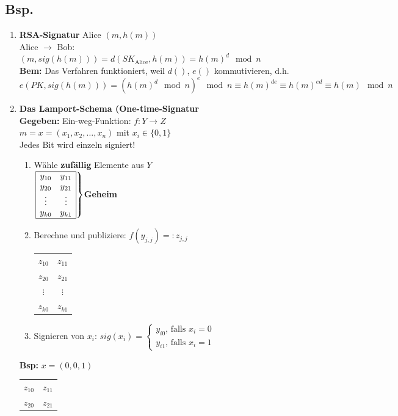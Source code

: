\documentclass[10pt]{article}
\newcommand{\Bold}[1]{\textbf{#1}} %
\newcommand{\T}[1]{\text{#1}} %
\newcommand{\Brackal}[2]{\left\lbrace\begin{array}{#1} #2 \end{array}\right.} %
\newcommand{\Brackar}[2]{\left.\begin{array}{#1} #2 \end{array}\right\rbrace} %
\begin{document}
\subsection*{Bsp.}
\begin{enumerate}
 \item \Bold{RSA-Signatur}
 Alice $(m,h(m))$\\
 Alice $\to$ Bob: $(m,sig(h(m)))=d(SK_{\T{Alice}},h(m))=h(m)^d\mod n$\\
 \Bold{Bem:} Das Verfahren funktioniert, weil $d()$, $e()$ kommutivieren, d.h.\\
 \begin{equation*}
 e(PK,sig(h(m)))=(h(m)^d\mod n)^e\mod n\equiv h(m)^{de}\equiv h(m)^{ed}\equiv h(m)\mod n
 \end{equation*}
 \item \Bold{Das Lamport-Schema (One-time-Signatur}\\
 \Bold{Gegeben:} Ein-weg-Funktion: $f:Y\to Z$\\
 $m=x=(x_1,x_2,\dots,x_n)$ mit $x_i\in\{0,1\}$\\
 Jedes Bit wird einzeln signiert!
 \begin{enumerate}
  \item Wähle \Bold{zufällig} Elemente aus $Y$\\
  $\Brackar{|cc|}{\hline
   y_{10}&y_{11}\\
   y_{20}&y_{21}\\
   \vdots&\vdots\\
   y_{k0}&y_{k1}\\\hline
  }$\Bold{Geheim}
  \item Berechne und publiziere: $f(y_{j,j})=:z_{j,j}$\\
  \begin{tabular}{|cc|}\hline
   $z_{10}$&$z_{11}$\\
   $z_{20}$&$z_{21}$\\
   $\vdots$&$\vdots$\\
   $z_{k0}$&$z_{k1}$\\\hline
  \end{tabular}
  \item Signieren von $x_i$: $sig(x_i)=\Brackal{c}{y_{i0}\T{, falls }x_i=0\\y_{i1}\T{, falls }x_i=1}$
 \end{enumerate}
 \Bold{Bsp:} $x=(0,0,1)$
   \begin{tabular}{|cc|}\hline
   $z_{10}$&$z_{11}$\\
   $z_{20}$&$z_{21}$\\

\end{tabular}
\end{enumerate}
\end{document}
